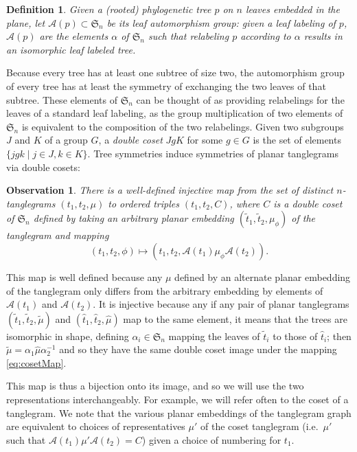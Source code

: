 \documentclass{amsart}
\newtheorem{definition}{Definition}
\newtheorem{observation}{Observation}
\newcommand{\fS}{\mathfrak S}
\newcommand{\aut}{\mathcal A}
\newcommand{\pairing}{\mu}
\begin{document}
\begin{definition}
Given a (rooted) phylogenetic tree $p$ on $n$ leaves embedded in the plane, let $\aut(p) \subset \fS_n$ be its leaf automorphism group: given a leaf labeling of $p$, $\aut(p)$ are the elements $\alpha$ of $\fS_n$ such that relabeling $p$ according to $\alpha$ results in an isomorphic leaf labeled tree.
\end{definition}
Because every tree has at least one subtree of size two, the automorphism group of every tree has at least the symmetry of exchanging the two leaves of that subtree.
These elements of $\fS_n$ can be thought of as providing relabelings for the leaves of a standard leaf labeling, as the group multiplication of two elements of $\fS_n$ is equivalent to the composition of the two relabelings.
Given two subgroups $J$ and $K$ of a group $G$, a \emph{double coset} $JgK$ for some $g \in G$ is the set of elements $\{jgk \mid j \in J, k \in K\}$.
Tree symmetries induce symmetries of planar tanglegrams via double cosets:
\begin{observation}
\label{obs:cosetMap}
There is a well-defined injective map from the set of distinct $n$-tanglegrams $(t_1, t_2, \pairing)$ to ordered triples $(t_1, t_2, C)$, where $C$ is a double coset of $\fS_n$ defined by taking an arbitrary planar embedding $(\tilde t_1, \tilde t_2, \pairing_\phi)$ of the tanglegram and mapping
\begin{equation}
\label{eq:cosetMap}
(t_1, t_2, \phi) \mapsto (t_1, t_2, \aut(t_1) \pairing_\phi \aut(t_2)).
\end{equation}
\end{observation}
This map is well defined because any $\pairing$ defined by an alternate planar embedding of the tanglegram only differs from the arbitrary embedding by elements of $\aut(t_1)$ and $\aut(t_2)$.
It is injective because any if any pair of planar tanglegrams $(\tilde t_1, \tilde t_2, \tilde \pairing)$ and $(\hat t_1, \hat t_2, \hat \pairing)$ map to the same element, it means that the trees are isomorphic in shape, defining $\alpha_i \in \fS_n$ mapping the leaves of $\tilde t_i$ to those of $\hat t_i$; then $\tilde \pairing = \alpha_1 \hat \pairing \alpha_2^{-1}$ and so they have the same double coset image under the mapping \eqref{eq:cosetMap}.

This map is thus a bijection onto its image, and so we will use the two representations interchangeably.
For example, we will refer often to the coset of a tanglegram.
We note that the various planar embeddings of the tanglegram graph are equivalent to choices of representatives $\pairing'$ of the coset tanglegram (i.e.\ $\pairing'$ such that $\aut(t_1) \pairing' \aut(t_2) = C$) given a choice of numbering for $t_1$.
\end{document}
